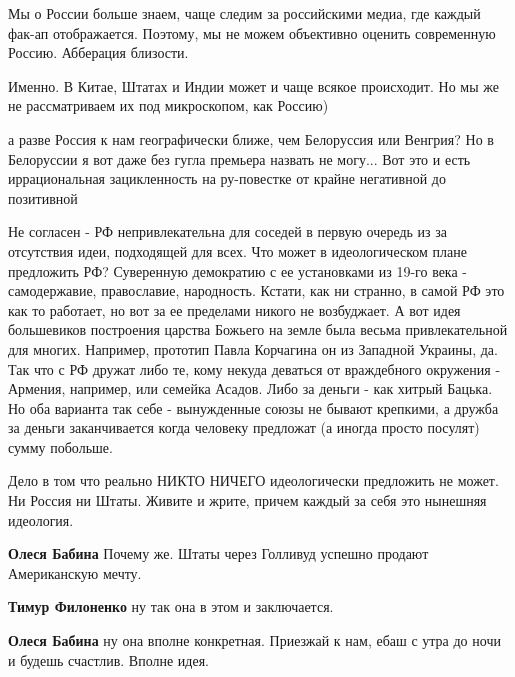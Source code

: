 \begin{itemize}

Мы о России больше знаем, чаще следим за российскими медиа, где каждый фак-ап
отображается. Поэтому, мы не можем объективно оценить современную Россию.
Абберация близости.

\begin{itemize} %
Именно. В Китае, Штатах и Индии может и чаще всякое происходит. Но мы же не рассматриваем их под микроскопом, как Россию)


а разве Россия к нам географически ближе, чем Белоруссия или Венгрия? Но в
Белоруссии я вот даже без гугла премьера назвать не могу... Вот это и есть
иррациональная зацикленность на ру-повестке от крайне негативной до позитивной

\end{itemize} %


Не согласен - РФ непривлекательна для соседей в первую очередь из за отсутствия
идеи, подходящей для всех. Что может в идеологическом плане предложить РФ?
Суверенную демократию с ее установками из 19-го века - самодержавие,
православие, народность. Кстати, как ни странно, в самой РФ это как то
работает, но вот за ее пределами никого не возбуджает. А вот идея большевиков
построения царства Божьего на земле была весьма привлекательной для многих.
Например, прототип Павла Корчагина он из Западной Украины, да. Так что с РФ
дружат либо те, кому некуда деваться от враждебного окружения - Армения,
например, или семейка Асадов. Либо за деньги - как хитрый Бацька. Но оба
варианта так себе - вынужденные союзы не бывают крепкими, а дружба за деньги
заканчивается когда человеку предложат (а иногда просто посулят) сумму
побольше.

\begin{itemize} %
Дело в том что реально НИКТО НИЧЕГО идеологически предложить не может. Ни Россия ни Штаты. Живите и жрите, причем каждый за себя это нынешняя идеология.

\textbf{Олеся Бабина} Почему же. Штаты через Голливуд успешно продают Американскую мечту.

\textbf{Тимур Филоненко} ну так она в этом и заключается.

\textbf{Олеся Бабина} ну она вполне конкретная. Приезжай к нам, ебаш с утра до ночи и будешь счастлив. Вполне идея.
\end{itemize} %


\end{itemize}

